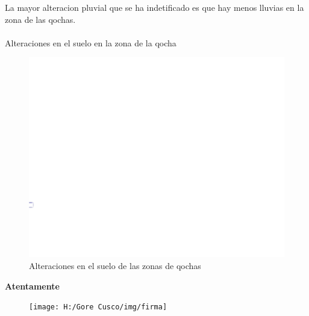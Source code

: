 \documentclass[12pt]{article}\usepackage[]{graphicx}\usepackage[]{xcolor}
\makeatletter
\def\maxwidth{ %
  \ifdim\Gin@nat@width>\linewidth
    \linewidth
  \else
    \Gin@nat@width
  \fi
}
\newenvironment{knitrout}{}{} %
\makeatother
\begin{document}
	La mayor alteracion pluvial que se ha indetificado es que hay menos lluvias en la zona de las qochas. \\
	\\
	Alteraciones en el suelo en la zona de la qocha
		\begin{figure}[H]
	\centering
\begin{knitrout}
\color{fgcolor}
\includegraphics[width=\maxwidth]{figure/treintayseis-1} 
\end{knitrout}
	\caption{Alteraciones en el suelo de las zonas de qochas}
	\end{figure}
	
	\begin{center}
		\textbf{Atentamente}
	\end{center}
	
	
	\begin{figure}[H]
		\centering
		\texttt{[image: H:/Gore Cusco/img/firma]}
	\end{figure}
	\thispagestyle{lastpage}
\end{document}
